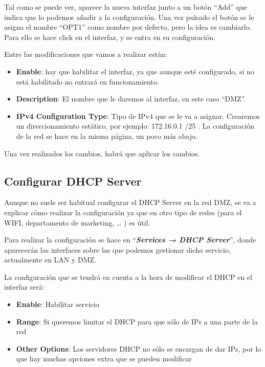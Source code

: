 Tal como se puede ver, aparece la nueva interfaz junto a un botón “Add” que indica que lo podemos añadir a la configuración. Una vez pulsado el botón se le asigna el nombre “OPT1” como nombre por defecto, pero la idea es cambiarlo. Para ello se hace click en el interfaz, y se entra en su configuración.

Entre las modificaciones que vamos a realizar están:

\begin{itemize}
    \item \textbf{Enable}: hay que habilitar el interfaz, ya que aunque esté configurado, si no está habilitado no entrará en funcionamiento.
    \item \textbf{Description}: El nombre que le daremos al interfaz, en este caso “DMZ”.
    \item \textbf{IPv4 Configuration Type}: Tipo de IPv4 que se le va a asignar. Crearemos un direccionamiento estático, por ejemplo: 172.16.0.1 /25 . La configuración de la red se hace en la misma página, un poco más abajo.
\end{itemize}

Una vez realizados los cambios, habrá que aplicar los cambios.


\subsection{Configurar DHCP Server}
Aunque no suele ser habitual configurar el DHCP Server en la red DMZ, se va a explicar cómo realizar la configuración ya que en otro tipo de redes (para el WIFI, departamento de marketing, … ) es útil.

Para realizar la configuración se hace en “\textbf{\textit{Services → DHCP Server}}”, donde aparecerán las interfaces sobre las que podemos gestionar dicho servicio, actualmente en LAN y DMZ.

La configuración que se tendrá en cuenta a la hora de modificar el DHCP en el interfaz será:

\begin{itemize}
    \item \textbf{Enable}: Habilitar servicio
    \item \textbf{Range}: Si queremos limitar el DHCP para que sólo de IPs a una parte de la red
    \item \textbf{Other Options}: Los servidores DHCP no sólo se encargan de dar IPs, por lo que hay muchas opciones extra que se pueden modificar
\end{itemize}

